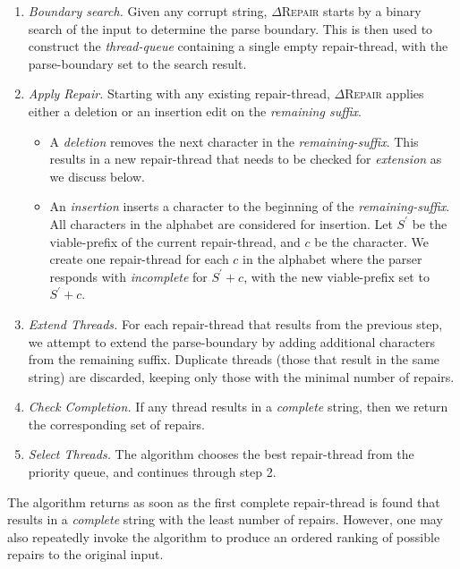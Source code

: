 \documentclass[acmsmall,screen,review,anonymous]{acmart}
\newcommand{\approach}{\textsc{$\Delta$Repair}\xspace}
\newcommand{\drepair}{\approach}
\begin{document}
\begin{enumerate}
\item \emph{Boundary search.} Given any corrupt string, \drepair starts by a
binary search of the input to determine the parse boundary. This is then used
to construct the \emph{thread-queue} containing a single empty repair-thread,
with the parse-boundary set to the search result.

\item \emph{Apply Repair.} Starting with any existing repair-thread, \drepair applies
either a deletion or an insertion edit on the \emph{remaining suffix}.
\begin{itemize}
\item A \emph{deletion} removes the next character in the \emph{remaining-suffix}.
This results in a new repair-thread that needs to be checked for \emph{extension} as we discuss below.
\item An \emph{insertion} inserts a character to the beginning of the \emph{remaining-suffix}.
All characters in the alphabet are considered for insertion.
Let $S^{'}$ be the viable-prefix of the current repair-thread, and $c$ be the character.
We create one repair-thread for each $c$ in the alphabet where the parser
responds with \emph{incomplete} for $S^{'}+c$, with the new viable-prefix set to $S^{'}+c$.
\end{itemize}
\item \emph{Extend Threads.} For each repair-thread that results from the previous step,
we attempt to extend the parse-boundary by adding additional characters from the
remaining suffix. Duplicate threads (those that result in the same string) are discarded,
keeping only those with the minimal number of repairs.
\item \emph{Check Completion.} If any thread results in a \emph{complete} string, then
we return the corresponding set of repairs.
\item \emph{Select Threads.} The algorithm chooses the best repair-thread from the priority queue,
and continues through step 2.
\end{enumerate}

The algorithm returns as soon as the first complete repair-thread is found that results
in a \emph{complete} string with the least number of repairs.
However, one may also repeatedly invoke the algorithm to produce an ordered
ranking of possible repairs to the original input.
\end{document}
